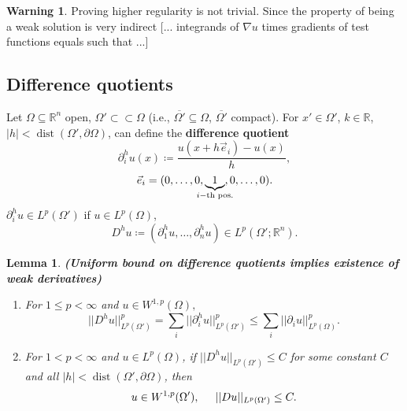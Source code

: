 \documentclass[12pt]{article}
\DeclareMathOperator{\dist}{dist}
\newtheorem{lemma}{Lemma}[section]
\theoremstyle{definition}
\newtheorem*{warning}{Warning}
\begin{document}
\begin{warning}
Proving higher regularity is not trivial. Since the property of being a weak solution is very indirect [... integrands of $\nabla u$ times gradients of test functions equals such that ...]
\end{warning}

\subsection{Difference quotients}
Let $\Omega\subseteq\mathbb{R}^n$ open, $\Omega'\subset\subset\Omega$ (i.e., $\overline{\Omega'}\subseteq\Omega$, $\overline{\Omega'}$ compact). For $x'\in\Omega'$, $k\in\mathbb{R}$, $|h|<\dist(\Omega',\partial\Omega)$, can define the \textbf{difference quotient}
\[\partial_i^hu(x)\coloneqq\frac{u(x+h\vec{e}_i)-u(x)}{h},\]
\[\vec{e}_i=(0,\ldots,0,\underbrace{1}_{\mathclap{i-\text{th pos.}}},0,\ldots,0).\]
$\partial_i^hu\in L^p(\Omega')$ if $u\in L^p(\Omega)$,
\[D^hu\coloneqq(\partial_1^hu,\ldots,\partial_n^hu)\in L^p(\Omega';\mathbb{R}^n).\]

\begin{lemma}\label{uniform_bound}
\emph{\textbf{(Uniform bound on difference quotients implies existence of weak derivatives)}}
\begin{enumerate}[label=(\roman*)]
\item\label{uniform_bound_difference} For $1\leq p<\infty$ and $u\in W^{1,p}(\Omega),$
\[||D^hu||_{L^p(\Omega')}^p=\sum_i||\partial_i^hu||_{L^p(\Omega')}^p\leq\sum_i||\partial_iu||_{L^p(\Omega)}^p.\]

\item\label{uniform_bound_differential} For $1<p<\infty$ and $u\in L^p(\Omega)$, if $||D^hu||_{L^p(\Omega')}\leq C$ for some constant $C$ and all $|h|<\dist(\Omega',\partial\Omega)$, then
\[u\in W^{1,p}(\Omega'),\hspace{5mm}||Du||_{L^p(\Omega')}\leq C.\]
\end{enumerate}
\end{lemma}
\end{document}
